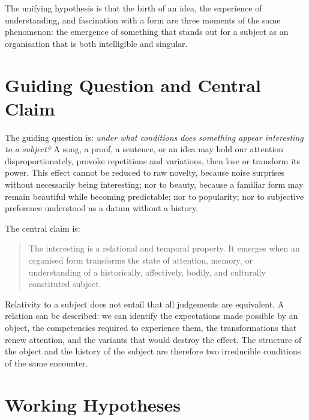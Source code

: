 \documentclass[11pt,a4paper]{article}
\begin{document}
The unifying hypothesis is that the birth of an idea, the experience of
understanding, and fascination with a form are three moments of the same
phenomenon: the emergence of something that stands out for a subject as an
organisation that is both intelligible and singular.

\section{Guiding Question and Central Claim}

The guiding question is: \emph{under what conditions does something appear
interesting to a subject?} A song, a proof, a sentence, or an idea may hold our
attention disproportionately, provoke repetitions and variations, then lose or
transform its power. This effect cannot be reduced to raw novelty, because noise
surprises without necessarily being interesting; nor to beauty, because a
familiar form may remain beautiful while becoming predictable; nor to
popularity; nor to subjective preference understood as a datum without a
history.

The central claim is:

\begin{quote}
The interesting is a relational and temporal property. It emerges when an
organised form transforms the state of attention, memory, or understanding of a
historically, affectively, bodily, and culturally constituted subject.
\end{quote}

Relativity to a subject does not entail that all judgements are equivalent. A
relation can be described: we can identify the expectations made possible by an
object, the competencies required to experience them, the transformations that
renew attention, and the variants that would destroy the effect. The structure
of the object and the history of the subject are therefore two irreducible
conditions of the same encounter.

\section{Working Hypotheses}
\end{document}
